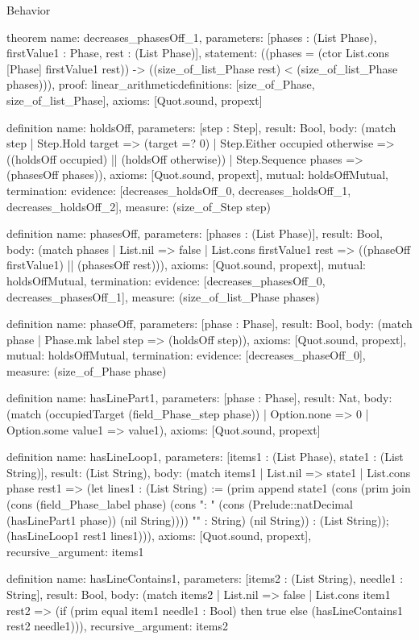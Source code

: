 \begin{lexlean}{Behavior}
\begin{semanticmodule}
theorem{
  name: decreases_phasesOff_1,
  parameters: [phases : (List Phase), firstValue1 : Phase, rest : (List Phase)],
  statement: ((phases = (ctor List.cons [Phase] firstValue1 rest)) -> ((size_of_list_Phase rest) < (size_of_list_Phase phases))),
  proof: linear_arithmetic{definitions: [size_of_Phase, size_of_list_Phase]},
  axioms: [Quot.sound, propext]
}

definition{
  name: holdsOff,
  parameters: [step : Step],
  result: Bool,
  body: (match step
    | Step.Hold target => (target =? 0)
    | Step.Either occupied otherwise => ((holdsOff occupied) || (holdsOff otherwise))
    | Step.Sequence phases => (phasesOff phases)),
  axioms: [Quot.sound, propext],
  mutual: holdsOffMutual,
  termination: {
    evidence: [decreases_holdsOff_0, decreases_holdsOff_1, decreases_holdsOff_2],
    measure: (size_of_Step step)
  }
}

definition{
  name: phasesOff,
  parameters: [phases : (List Phase)],
  result: Bool,
  body: (match phases
    | List.nil => false
    | List.cons firstValue1 rest => ((phaseOff firstValue1) || (phasesOff rest))),
  axioms: [Quot.sound, propext],
  mutual: holdsOffMutual,
  termination: {
    evidence: [decreases_phasesOff_0, decreases_phasesOff_1],
    measure: (size_of_list_Phase phases)
  }
}

definition{
  name: phaseOff,
  parameters: [phase : Phase],
  result: Bool,
  body: (match phase | Phase.mk label step => (holdsOff step)),
  axioms: [Quot.sound, propext],
  mutual: holdsOffMutual,
  termination: {evidence: [decreases_phaseOff_0], measure: (size_of_Phase phase)}
}

definition{
  name: hasLinePart1,
  parameters: [phase : Phase],
  result: Nat,
  body: (match (occupiedTarget (field_Phase_step phase))
    | Option.none => 0
    | Option.some value1 => value1),
  axioms: [Quot.sound, propext]
}

definition{
  name: hasLineLoop1,
  parameters: [items1 : (List Phase), state1 : (List String)],
  result: (List String),
  body: (match items1
    | List.nil => state1
    | List.cons phase rest1 => (let lines1 : (List String) := (prim append state1 (cons (prim join (cons (field_Phase_label phase) (cons ": " (cons (Prelude::natDecimal (hasLinePart1 phase)) (nil String)))) "" : String) (nil String)) : (List String)); (hasLineLoop1 rest1 lines1))),
  axioms: [Quot.sound, propext],
  recursive_argument: items1
}

definition{
  name: hasLineContains1,
  parameters: [items2 : (List String), needle1 : String],
  result: Bool,
  body: (match items2
    | List.nil => false
    | List.cons item1 rest2 => (if (prim equal item1 needle1 : Bool) then true else (hasLineContains1 rest2 needle1))),
  recursive_argument: items2
}


\end{semanticmodule}
\end{lexlean}
